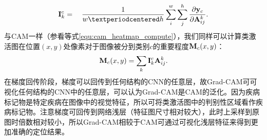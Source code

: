\begin{equation}
\ve{I}_{k}^{c}=\quad \frac{1}{w·h} \sum_{i}^{w} \sum_{j}^{h} \frac{\partial \ve{y}_{c}}{\partial \ve{A}_{i j}^{k}}.
\end{equation}
与CAM一样（参看等式\ref{equ:cam_heatmap_compute}），我们同样可以计算类激活图在位置$(x,y)$处像素对于图像被分到类别$c$的重要程度$\mathbf{M}_c(x, y)$：
\begin{equation}\label{equ:grad_cam_heatmap_compute}
\mathbf{M}_{c}(x, y)=\sum_{k} \mathbf{I}_{k}^{c} \mathbf{A}^{k}_{ij}.
\end{equation}
在梯度回传阶段，梯度可以回传到任何结构的CNN的任意层，故Grad-CAM可可视化任何结构的CNN中的任意层，可以认为Grad-CAM是CAM的泛化。因为疾病标记物是特定疾病在图像中的视觉特征，所以可将类激活图中的判别性区域看作疾病标记物。注意梯度可回传到网络浅层（特征图尺寸相对较大），此时上采样到原图时倍数相对较小，所以Grad-CAM相较于CAM可通过可视化浅层特征来得到更加准确的定位结果。
